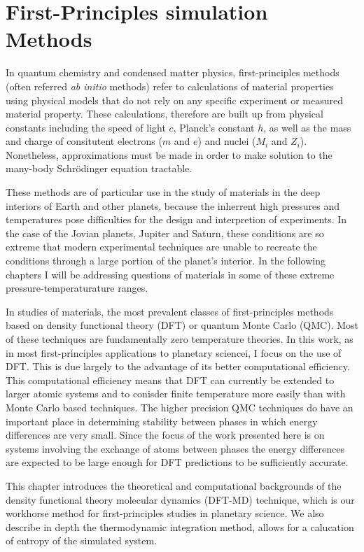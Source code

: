 \chapter{First-Principles simulation Methods}\label{chap2}


In quantum chemistry and condensed matter physics, first-principles methods (often
referred \textit{ab initio} methods) refer to calculations of material properties
using physical models that do not rely on any specific experiment or measured
material property. These calculations, therefore are built up from physical constants
including the speed of light $c$, Planck's constant $h$, as well as the mass  and
charge of consitutent electrons ($m$ and $e$) and nuclei ($M_i$ and $Z_i$). Nonetheless,
approximations must be made in order to make solution to the many-body Schr\"odinger
equation tractable.

These methods are of particular use in the study of materials in the deep interiors
of Earth and other planets, because the inherrent high pressures and temperatures
pose difficulties for the design and interpretion of experiments. In the case of the
Jovian planets, Jupiter and Saturn, these conditions are so extreme that modern
experimental techniques are unable to recreate the conditions through a large portion
of the planet's interior. In the following chapters I will be addressing questions of
materials in some of these extreme pressure-temperaturature ranges.

In studies of materials, the most prevalent classes of first-principles methods based
on density functional theory (DFT) or quantum Monte Carlo (QMC). Most of these
techniques are fundamentally zero temperature theories. In this work, as in most
first-principles applications to planetary sciencei, I focus on the use of DFT. This
is due largely to the advantage of its better computational efficiency. This
computational efficiency means that DFT can currently be extended to larger atomic
systems and to conisder finite temperature more easily than with Monte Carlo based
techniques. The higher precision QMC techniques do have an important place in
determining stability between phases in which energy differences are very small.
Since the focus of the work presented here is on systems involving the exchange of
atoms between phases the energy differences are expected to be large enough for DFT
predictions to be sufficiently accurate.

This chapter introduces the theoretical and computational backgrounds of the density
functional theory molecular dynamics (DFT-MD) technique, which is our workhorse
method for first-principles studies in planetary science. We also describe in depth
the thermodynamic integration method, allows for a calucation of entropy of the
simulated system.


